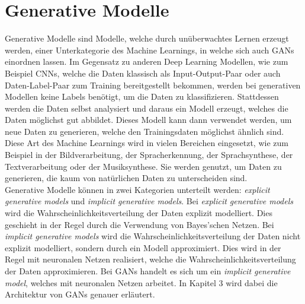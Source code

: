 \section{Generative Modelle}

\noindent Generative Modelle sind Modelle, welche durch unüberwachtes Lernen erzeugt werden, einer Unterkategorie des Machine Learnings, in welche sich auch \acp{GAN} einordnen lassen. Im Gegensatz zu anderen Deep Learning Modellen, wie zum Beispiel \acfp{CNN}, welche die Daten klassisch als Input-Output-Paar oder auch Daten-Label-Paar zum Training bereitgestellt bekommen, werden bei generativen Modellen keine Labels benötigt, um die Daten zu klassifizieren. Stattdessen werden die Daten selbst analysiert und daraus ein Modell erzeugt, welches die Daten möglichst gut abbildet. Dieses Modell kann dann verwendet werden, um neue Daten zu generieren, welche den Trainingsdaten möglichst ähnlich sind.\cite{mlbook}\\

\noindent Diese Art des Machine Learnings wird in vielen Bereichen eingesetzt, wie zum Beispiel in der Bildverarbeitung, der Spracherkennung, der Sprachsynthese, der Textverarbeitung oder der Musiksynthese. Sie werden genutzt, um Daten zu generieren, die kaum von natürlichen Daten zu unterscheiden sind. \\

\noindent Generative Modelle können in zwei Kategorien unterteilt werden: \textit{explicit generative models} und \textit{implicit generative models}. Bei \textit{explicit generative models} wird die Wahrscheinlichkeitsverteilung der Daten explizit modelliert. Dies geschieht in der Regel durch die Verwendung von Bayes'schen Netzen. Bei \textit{implicit generative models} wird die Wahrscheinlichkeitsverteilung der Daten nicht explizit modelliert, sondern durch ein Modell approximiert. Dies wird in der Regel mit neuronalen Netzen realisiert, welche die Wahrscheinlichkeitsverteilung der Daten approximieren. Bei \acp{GAN} handelt es sich um ein \textit{implicit generative model}, welches mit neuronalen Netzen arbeitet. In Kapitel 3 wird dabei die Architektur von \acp{GAN} genauer erläutert.\\


\newpage